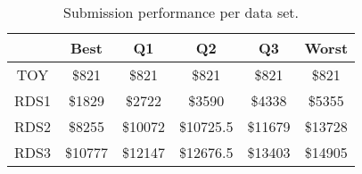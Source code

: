 \begin{table}
\footnotesize
\caption{Submission performance per data set.}
\centering
\begin{tabular}{c||c|c|c|c|c}
\hline \hline
                 & Best                 & Q1                 & Q2                & Q3                & Worst \\ 
\hline
TOY & \$821   & \$821   & \$821  & \$821  & \$821 \\
\hline
RDS1 & \$1829   & \$2722   & \$3590  & \$4338  & \$5355 \\
\hline
RDS2 & \$8255   & \$10072   & \$10725.5  & \$11679  & \$13728 \\
\hline
RDS3 & \$10777   & \$12147   & \$12676.5  & \$13403  & \$14905 \\
\end{tabular} 
\label{table:result} 
\end{table}